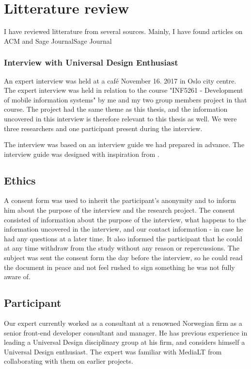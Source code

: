 \section{Litterature review}
I have reviewed litterature from several sources. Mainly, I have found articles on ACM and Sage JournalSage Journal








\subsubsection{Interview with Universal Design Enthusiast}
An expert interview was held at a café November 16. 2017 in Oslo city centre. The expert interview was held in relation to the course "INF5261 - Development of mobile information systems" by me and my two group members project in that course. The project had the same theme as this thesis, and the information uncovered in this interview is therefore relevant to this thesis as well. We were three researchers and one participant present during the interview.

The interview was based on an interview guide we had prepared in advance. The interview guide was designed with inspiration from \textcite{tone_nordbo_introduksjon_2017}.

\subsection{Ethics}
A consent form was used to inherit the participant's anonymity and to inform him about the purpose of the interview and the research project. The consent consisted of information about the purpose of the interview, what happens to the information uncovered in the interview, and our contact information - in case he had any questions at a later time. It also informed the participant that he could at any time withdraw from the study without any reason or repercussions. The subject was sent the consent form the day before the interview, so he could read the document in peace and not feel rushed to sign something he was not fully aware of.

\subsection{Participant}
Our expert currently worked as a consultant at a renowned Norwegian firm as a senior front-end developer consultant and manager. He has previous experience in leading a Universal Design disciplinary group at his firm, and considers himself a Universal Design enthusiast. The expert was familiar with MediaLT from collaborating with them on earlier projects.

